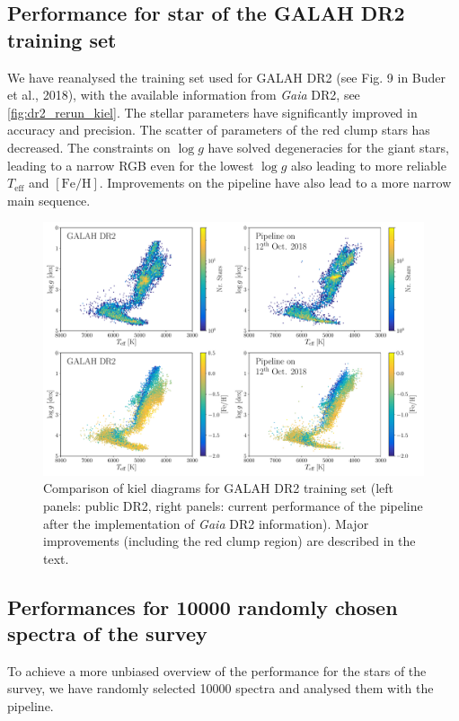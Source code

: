 \documentclass[a4paper,11pt,english]{article}
\begin{document}
\subsection{Performance for star of the GALAH DR2 training set}

We have reanalysed the training set used for GALAH DR2 (see Fig. 9 in Buder et al., 2018), with the available information from \textit{Gaia} DR2, see \autoref{fig:dr2_rerun_kiel}. The stellar parameters have significantly improved in accuracy and precision. The scatter of parameters of the red clump stars has decreased. The constraints on $\log g$ have solved degeneracies for the giant stars, leading to a narrow RGB even for the lowest $\log g$ also leading to more reliable $T_\text{eff}$ and $\mathrm{[Fe/H]}$. Improvements on the pipeline have also lead to a more narrow main sequence.

\begin{figure}[!ht]
\centering
\includegraphics[width=\textwidth]{../../DR2_rerun/figures/dr2_rerun_kiel_comparison.pdf}
\caption{Comparison of kiel diagrams for GALAH DR2 training set (left panels: public DR2, right panels: current performance of the pipeline after the implementation of \textit{Gaia} DR2 information). Major improvements (including the red clump region) are described in the text.}
\label{fig:dr2_rerun_kiel}
\end{figure}

\subsection{Performances for 10000 randomly chosen spectra of the survey}

To achieve a more unbiased overview of the performance for the stars of the survey, we have randomly selected 10000 spectra and analysed them with the pipeline.
\end{document}
